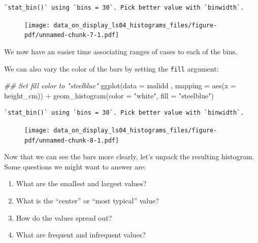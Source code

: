 \documentclass[
  letterpaper,
  DIV=11,
  numbers=noendperiod]{scrreprt}
\newenvironment{Shaded}{\begin{snugshade}}{\end{snugshade}}
\newcommand{\AttributeTok}[1]{\textcolor[rgb]{0.40,0.45,0.13}{#1}}
\newcommand{\DocumentationTok}[1]{\textcolor[rgb]{0.37,0.37,0.37}{\textit{#1}}}
\newcommand{\FunctionTok}[1]{\textcolor[rgb]{0.28,0.35,0.67}{#1}}
\newcommand{\NormalTok}[1]{\textcolor[rgb]{0.00,0.23,0.31}{#1}}
\newcommand{\SpecialCharTok}[1]{\textcolor[rgb]{0.37,0.37,0.37}{#1}}
\newcommand{\StringTok}[1]{\textcolor[rgb]{0.13,0.47,0.30}{#1}}
\providecommand{\tightlist}{%
  \setlength{\itemsep}{0pt}\setlength{\parskip}{0pt}}\usepackage{longtable,booktabs,array}
\begin{document}
\begin{verbatim}
`stat_bin()` using `bins = 30`. Pick better value with `binwidth`.
\end{verbatim}

\begin{figure}[H]

{\centering \texttt{[image: data\_on\_display\_ls04\_histograms\_files/figure-pdf/unnamed-chunk-7-1.pdf]}

}

\end{figure}

We now have an easier time associating ranges of cases to each of the
bins.

We can also vary the color of the bars by setting the \texttt{fill}
argument:

\begin{Shaded}
\begin{Highlighting}[]
\DocumentationTok{\#\# Set fill color to "steelblue"}
\FunctionTok{ggplot}\NormalTok{(}\AttributeTok{data =}\NormalTok{  malidd , }
       \AttributeTok{mapping =} \FunctionTok{aes}\NormalTok{(}\AttributeTok{x =}\NormalTok{ height\_cm)) }\SpecialCharTok{+}
  \FunctionTok{geom\_histogram}\NormalTok{(}\AttributeTok{color =} \StringTok{"white"}\NormalTok{, }
                 \AttributeTok{fill =} \StringTok{"steelblue"}\NormalTok{)}
\end{Highlighting}
\end{Shaded}

\begin{verbatim}
`stat_bin()` using `bins = 30`. Pick better value with `binwidth`.
\end{verbatim}

\begin{figure}[H]

{\centering \texttt{[image: data\_on\_display\_ls04\_histograms\_files/figure-pdf/unnamed-chunk-8-1.pdf]}

}

\end{figure}

Now that we can see the bars more clearly, let's unpack the resulting
histogram. Some questions we might want to answer are:

\begin{enumerate}
\def\labelenumi{\arabic{enumi}.}
\tightlist
\item
  What are the smallest and largest values?
\item
  What is the ``center'' or ``most typical'' value?
\item
  How do the values spread out?
\item
  What are frequent and infrequent values?
\end{enumerate}
\end{document}
